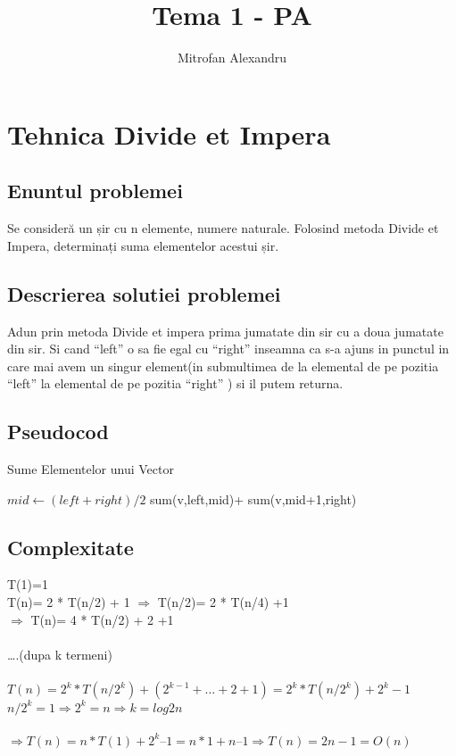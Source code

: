 \documentclass[runningheads]{llncs}
\begin{document}
%
\title{Tema 1 - PA}
\author{Mitrofan Alexandru}
%
\maketitle
%
\section{Tehnica Divide et Impera}
\subsection{Enuntul problemei}

Se consideră un șir cu n elemente, numere naturale. Folosind metoda Divide et Impera, determinați suma elementelor acestui șir.

\subsection{Descrierea solutiei problemei}
Adun prin metoda Divide et impera prima jumatate din sir cu a doua jumatate din sir. Si cand “left” o sa fie egal cu “right” inseamna ca s-a ajuns in punctul in care mai avem un singur element(in submultimea de la elemental de pe pozitia “left” la elemental de pe pozitia “right”     ) si il putem returna.
\subsection{Pseudocod}
\begin{algorithm}
\caption{Sume Elementelor unui Vector}\label{euclid}
\begin{algorithmic}[1]
\State $mid\gets (left+right)/2$
 \State {}
\Else 
\State \Return sum(v,left,mid)+ sum(v,mid+1,right)
\EndIf
\EndProcedure
\end{algorithmic}
\end{algorithm}

\subsection{Complexitate}
T(1)=1\\
T(n)=  2 * T(n/2) + 1  $\Rightarrow$  T(n/2)=  2 * T(n/4) +1\\
$\Rightarrow$ T(n)=  4 * T(n/2) + 2 +1  \\
\\
….(dupa k termeni)\\
\\
$T(n)=2^{k}*T(n/2^k) + (2^{k-1}+…+2+1) = 2^k*T(n/2^k) + 2^k -1$\\
$n/2^k=1 \Rightarrow  2^k = n \Rightarrow k=log2 n$\\
\\
$\Rightarrow T(n) = n * T(1) + 2^k – 1 = n*1 + n – 1 \Rightarrow  T(n)=2n-1 = O(n )$\\
\end{document}
